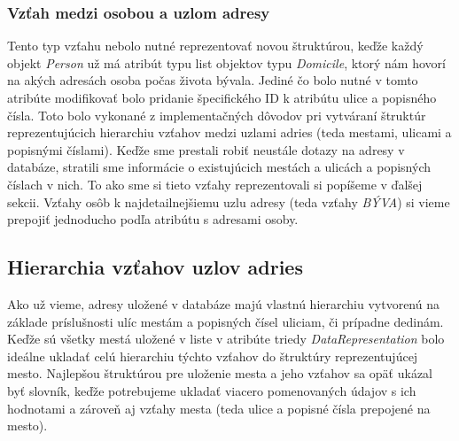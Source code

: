\subsubsection{Vzťah medzi osobou a uzlom adresy}

Tento typ vzťahu nebolo nutné reprezentovať novou štruktúrou, keďže každý objekt \textit{Person} už má atribút typu list objektov typu \textit{Domicile}, ktorý nám hovorí na akých adresách osoba počas života bývala. Jediné čo bolo nutné v tomto atribúte modifikovať bolo pridanie špecifického ID k atribútu ulice a popisného čísla. Toto bolo vykonané z implementačných dôvodov pri vytváraní štruktúr reprezentujúcich hierarchiu vzťahov medzi uzlami adries (teda mestami, ulicami a popisnými číslami). Keďže sme prestali robiť neustále dotazy na adresy v databáze, stratili sme informácie o existujúcich mestách a ulicách a popisných číslach v nich. To ako sme si tieto vzťahy reprezentovali si popíšeme v ďalšej sekcii. Vzťahy osôb k najdetailnejšiemu uzlu adresy (teda vzťahy \textit{BÝVA}) si vieme prepojiť jednoducho podľa atribútu s adresami osoby.

\subsection{Hierarchia vzťahov uzlov adries}

Ako už vieme, adresy uložené v databáze majú vlastnú hierarchiu vytvorenú na základe príslušnosti ulíc mestám a popisných čísel uliciam, či prípadne dedinám. Keďže sú všetky mestá uložené v liste v atribúte triedy \textit{DataRepresentation} bolo ideálne ukladať celú hierarchiu týchto vzťahov do štruktúry reprezentujúcej mesto. Najlepšou štruktúrou pre uloženie mesta a jeho vzťahov sa opäť ukázal byť slovník, keďže potrebujeme ukladať viacero pomenovaných údajov s ich hodnotami a zároveň aj vzťahy mesta (teda ulice a popisné čísla prepojené na mesto).


